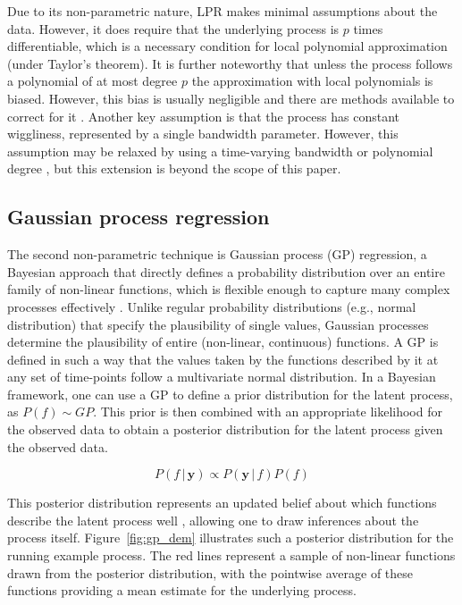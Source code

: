 \documentclass[man, floatsintext]{apa7}
\begin{document}
Due to its non-parametric nature, LPR makes minimal assumptions about the data.
However, it does require that the underlying process is $p$ times
differentiable, which is a necessary condition for local polynomial
approximation (under Taylor's theorem). It is further noteworthy
that unless the process follows a polynomial of at most degree $p$ the
approximation with local polynomials is biased. However, this bias is usually
negligible and there are methods available to correct for it
\parencite{R-nprobust}. Another key assumption is that the process has constant
wiggliness, represented by a single bandwidth parameter. However, this
assumption may be relaxed by using a time-varying bandwidth
\parencite{fan_data-driven_1995} or polynomial degree
\parencite{fan_adaptive_1995}, but this extension is beyond the scope of this
paper.

\subsection{Gaussian process regression}

The second non-parametric technique is Gaussian process (GP) regression, a
Bayesian approach that directly defines a probability distribution over an
entire family of non-linear functions, which is flexible enough to capture many
complex processes effectively \parencite{rasmussen_gaussian_2006,
  betancourt_robust_2020, roberts_gaussian_2013}. Unlike regular probability
distributions (e.g., normal distribution) that specify the plausibility of
single values, Gaussian processes determine the plausibility of entire
(non-linear, continuous)  functions. A GP is defined in such a way that the
values taken by the functions described by it at any set of time-points follow
a multivariate normal distribution. In a Bayesian framework, one can use a GP
to define a prior distribution for the latent process, as $P(f) \sim GP$. This
prior is then combined with an appropriate likelihood for the observed data to
obtain a posterior distribution for the latent process given the observed data.

\begin{equation}
  P(f \, | \, \textbf{y})  \propto P(\textbf{y} \, | \, f) P(f)
\end{equation}

\noindent This posterior distribution represents an updated belief about which
functions describe the latent process well \parencite{kruschke_doing_2011},
allowing one to draw inferences about the process itself.
Figure~\ref{fig:gp_dem} illustrates such a posterior distribution for the
running example process. The red lines represent a sample of non-linear
functions drawn from the posterior distribution, with the pointwise average of
these functions providing a mean estimate for the underlying process.
\end{document}
